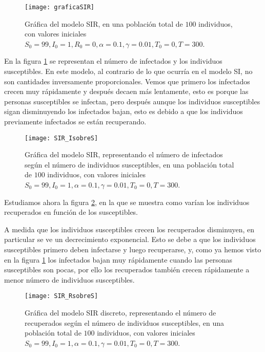 \begin{figure}
\begin{center}
\caption{Gráfica del modelo SIR, en una población total de $100$ individuos, con valores iniciales $S_0=99, I_0 = 1, R_0 = 0, \alpha = 0.1, \gamma = 0.01, T_0 = 0, T = 300$.}
\texttt{[image: graficaSIR]}
\end{center}
\end{figure}

En la figura \ref{fig: SIR_IsobreS} se representan el número de infectados y los individuos susceptibles. En este modelo, al contrario de lo que ocurría en el modelo SI, no son cantidades inversamente proporcionales. Vemos que primero los infectados crecen muy rápidamente y después decaen más lentamente, esto es porque las personas susceptibles se infectan, pero después aunque los individuos susceptibles sigan disminuyendo los infectados bajan, esto es debido a que los individuos previamente infectados se están recuperando.

\begin{figure}
\begin{center}
\caption{Gráfica del modelo SIR, representando el número de infectados según el número de individuos susceptibles, en una población total de $100$ individuos, con valores iniciales $S_0=99, I_0 = 1, \alpha = 0.1, \gamma=0.01, T_0 = 0, T = 300$.}
\label{fig: SIR_IsobreS}
\texttt{[image: SIR\_IsobreS]}
\end{center}
\end{figure}

Estudiamos ahora la figura \ref{fig: SIR_RsobreS}, en la que se muestra como varían los individuos recuperados en función de los susceptibles.

A medida que los individuos susceptibles crecen los recuperados disminuyen, en particular se ve un decrecimiento exponencial. Esto se debe a que los individuos susceptibles primero deben infectarse y luego recuperarse, y, como ya hemos visto en la figura \ref{fig: SIR_IsobreS} los infectados bajan muy rápidamente cuando las personas susceptibles son pocas, por ello los recuperados también crecen rápidamente a menor número de individuos susceptibles.

\begin{figure}
\begin{center}
\caption{Gráfica del modelo SIR discreto, representando el número de recuperados según el número de individuos susceptibles, en una población total de $100$ individuos, con valores iniciales $S_0=99, I_0 = 1, \alpha = 0.1, \gamma=0.01, T_0 = 0, T = 300$.}
\label{fig: SIR_RsobreS}
\texttt{[image: SIR\_RsobreS]}
\end{center}
\end{figure}

